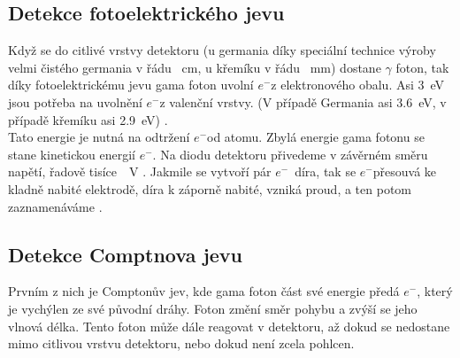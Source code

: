 \documentclass[12pt,a4paper]{article}
\newcommand{\e}{$e^-$}
\begin{document}
\begin{spacing}{1.5}
\subsection{Detekce fotoelektrického jevu}
Když se do citlivé vrstvy detektoru (u germania díky speciální technice výroby velmi čistého germania v řádu \SI{}{\centi\meter}, u křemíku v řádu \SI{}{\milli\meter})  \cite{Knoll2010} %
dostane $\gamma$ foton, tak díky fotoelektrickému jevu gama foton uvolní \e z elektronového obalu. Asi \SI{3}{\electronvolt} jsou potřeba na uvolnění \e z valenční vrstvy. (V případě Germania asi \SI{3,6}{\electronvolt}, v případě křemíku asi \SI{2,9}{\electronvolt}) \cite{astrnukleofyzika, nuclear_power-hpge}.\\ %
Tato energie je nutná na odtržení \e od atomu. Zbylá energie gama fotonu se stane kinetickou energií \e.  \cite{semiconductors} %
Na diodu detektoru přivedeme v závěrném směru napětí, řadově tisíce~\SI{}{\volt} \cite{hpge-detector_fabrication}. %
Jakmile se vytvoří pár \e~díra, tak se \e  přesouvá ke kladně nabité elektrodě, díra k záporně nabité, vzniká proud, a ten potom zaznamenáváme \cite{VUT,Knoll2010}. 
\subsection{Detekce Comptnova jevu}
Prvním z nich je Comptonův jev, kde gama foton část své energie předá \e , který je vychýlen ze své původní dráhy. Foton změní směr pohybu a zvýší se jeho vlnová délka. \cite{robert_macku}
Tento foton může dále reagovat v detektoru, až dokud se nedostane mimo citlivou vrstvu detektoru, \break nebo dokud není zcela pohlcen.\\

\end{spacing}
\end{document}
